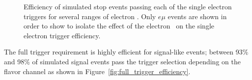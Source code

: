 \begin{figure}[ht]
  \centering
  \caption{Efficiency of simulated stop events passing each of the single
    electron triggers for several ranges of electron \ET.
    Only $e\mu$ events are shown in order to show to isolate the effect of
    the electron \ET\ on the single electron trigger efficiency.
  }
  \label{fig:electron_trigger_pt_dependence}
\end{figure}

The full trigger requirement is highly efficient for signal-like events; between
93\% and 98\% of simulated signal events pass the trigger selection depending
on the flavor channel as shown in Figure~\ref{fig:full_trigger_efficiency}.

